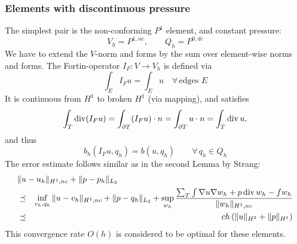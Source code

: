 \subsubsection{Elements with discontinuous pressure}
The simplest pair is the non-conforming $P^1$ element, and constant pressure:
$$
V_h  = P^{1,nc}, \qquad Q_h = P^{0,dc}
$$
We have to extend the $V$-norm and forms by the sum over element-wise norms and forms.
The Fortin-operator $I_F : V \rightarrow V_h$ is defined via
$$
\int_E I_F u = \int_E u \quad \forall \, \text{edges } E
$$
It is continuous from $H^1$ to broken $H^1$ (via mapping), and satisfies
$$
\int_T \operatorname{div} (I_F u) = \int_{\partial T} (I_F u) \cdot n = \int_{\partial T} u \cdot n = \int_T \operatorname{div} u,
$$
and thus
$$
b_h(I_F u, q_h) = b(u, q_h) \qquad \forall \, q_h \in Q_h
$$
The error estimate follows similar as in the second Lemma by Strang:
\begin{eqnarray*}
\lefteqn{\| u - u_h\|_{H^1,nc} + \| p - p_h \|_{L_2}} \\
& \leqc &\inf_{v_h, q_h} \| u - v_h \|_{H^1,nc} + \| p - q_h\|_{L_2} 
+ \sup_{w_h} \frac{ \sum_T \int \nabla u \nabla w_h   + p \opdiv w_h - f w_h} {\| w_h \|_{H^1,nc} } \\
& \leqc & c h \, (  \| u \|_{H^2} + \| p \|_{H^1} )
\end{eqnarray*}
This convergence rate $O(h)$ is considered to be optimal for these elements.


